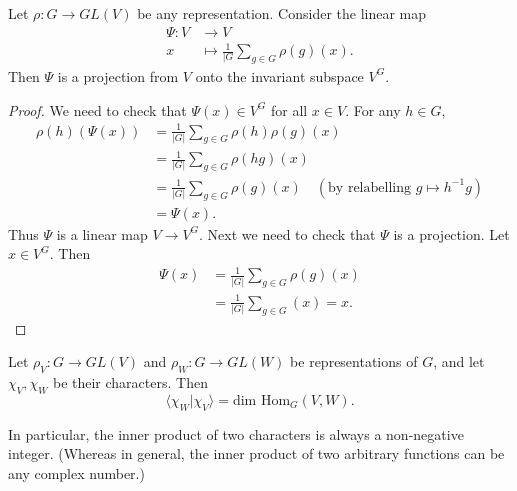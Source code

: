 \begin{lemma}
Let $\rho \colon G \to GL(V)$ be any representation.  Consider the linear map 
\begin{align*}
\Psi \colon V &\to V \\
x &\mapsto \frac{1}{|G} \sum_{g \in G} \rho(g)(x).
\end{align*}
Then $\Psi$ is a  projection from $V$ onto the invariant subspace $V^G$.
\end{lemma}
\begin{proof}
We need to check that $\Psi(x) \in V^G$ for all $x \in V$.  For any $h \in G$, 
\begin{align*}
\rho(h)(\Psi(x)) &= \frac{1}{|G|}  \sum_{g \in G} \rho(h)\rho(g)(x) \\
&= \frac{1}{|G|}\sum_{g \in G} \rho(h g) (x) \\
&= \frac{1}{|G|} \sum_{g \in G} \rho(g)(x) \quad (\text{by relabelling } g \mapsto h^{-1}g) \\
&= \Psi(x).
\end{align*}
Thus $\Psi$ is a linear map $V \to V^G$.  Next we need to check that $\Psi$ is a projection.  Let $x \in V^G$.  Then
\begin{align*}
\Psi(x) &= \frac{1}{|G|} \sum_{g \in G} \rho(g)(x) \\
&= \frac{1}{|G|} \sum_{g \in G} (x) = x.
\end{align*}
\end{proof}

\begin{thm}
Let $\rho_V \colon G \to GL(V)$ and $\rho_W \colon G \to GL(W)$ be representations of $G$, and let $\chi_V, \chi_W$ be their characters.  Then 
\[ \langle \chi_W | \chi_V \rangle = \text{dim Hom}_G (V,W). \]
\end{thm}
In particular, the inner product of two characters is always a non-negative integer.  (Whereas in general, the inner product of two arbitrary functions can be any complex number.)

